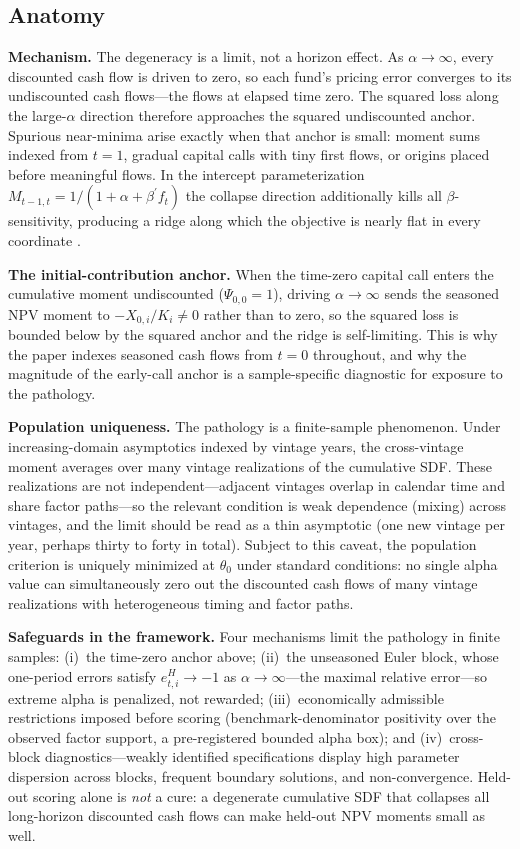 \documentclass[11pt]{article}
\begin{document}
\subsection{Anatomy}

\textbf{Mechanism.} The degeneracy is a limit, not a horizon effect. As \(\alpha\to\infty\), every discounted cash flow is driven to zero, so each fund's pricing error converges to its undiscounted cash flows---the flows at elapsed time zero. The squared loss along the large-\(\alpha\) direction therefore approaches the squared undiscounted anchor. Spurious near-minima arise exactly when that anchor is small: moment sums indexed from \(t=1\), gradual capital calls with tiny first flows, or origins placed before meaningful flows. In the intercept parameterization \(M_{t-1,t}=1/(1+\alpha+\beta^\prime f_t)\) the collapse direction additionally kills all \(\beta\)-sensitivity, producing a ridge along which the objective is nearly flat in every coordinate \citep{DriessenLinPhalippou2012,DriessenLinPhalippou2008WP}.

\textbf{The initial-contribution anchor.} When the time-zero capital call enters the cumulative moment undiscounted (\(\Psi_{0,0}=1\)), driving \(\alpha\to\infty\) sends the seasoned NPV moment to \(-X_{0,i}/K_i\neq 0\) rather than to zero, so the squared loss is bounded below by the squared anchor and the ridge is self-limiting. This is why the paper indexes seasoned cash flows from \(t=0\) throughout, and why the magnitude of the early-call anchor is a sample-specific diagnostic for exposure to the pathology.

\textbf{Population uniqueness.} The pathology is a finite-sample phenomenon. Under increasing-domain asymptotics indexed by vintage years, the cross-vintage moment averages over many vintage realizations of the cumulative SDF. These realizations are not independent---adjacent vintages overlap in calendar time and share factor paths---so the relevant condition is weak dependence (mixing) across vintages, and the limit should be read as a thin asymptotic (one new vintage per year, perhaps thirty to forty in total). Subject to this caveat, the population criterion is uniquely minimized at \(\theta_0\) under standard conditions: no single alpha value can simultaneously zero out the discounted cash flows of many vintage realizations with heterogeneous timing and factor paths.

\textbf{Safeguards in the framework.} Four mechanisms limit the pathology in finite samples: (i)~the time-zero anchor above; (ii)~the unseasoned Euler block, whose one-period errors satisfy \(e^H_{t,i}\to-1\) as \(\alpha\to\infty\)---the maximal relative error---so extreme alpha is penalized, not rewarded; (iii)~economically admissible restrictions imposed before scoring (benchmark-denominator positivity over the observed factor support, a pre-registered bounded alpha box); and (iv)~cross-block diagnostics---weakly identified specifications display high parameter dispersion across blocks, frequent boundary solutions, and non-convergence. Held-out scoring alone is \emph{not} a cure: a degenerate cumulative SDF that collapses all long-horizon discounted cash flows can make held-out NPV moments small as well.
\end{document}
